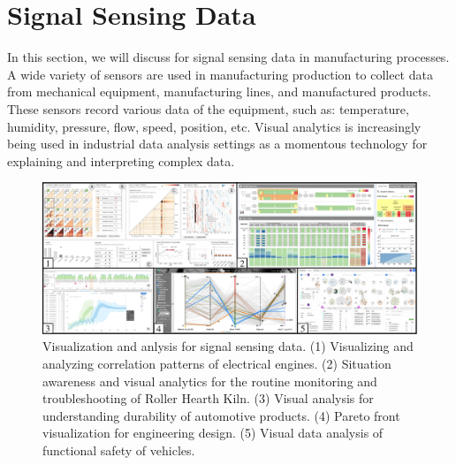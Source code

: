 \documentclass[a4paper,fleqn]{cas-dc}
\begin{document}
\section{Signal Sensing Data}
In this section, we will discuss for signal sensing data in manufacturing processes.
A wide variety of sensors are used in manufacturing production to collect data from mechanical equipment, manufacturing lines, and manufactured products.
These sensors record various data of the equipment, such as: temperature, humidity, pressure, flow, speed, position, etc.
Visual analytics is increasingly being used in industrial data analysis settings as a momentous technology for explaining and interpreting complex data.

\begin{figure}
	\centering
	\includegraphics[width=\textwidth]{Images/signal data.pdf}
	\vspace{-1em}
	\caption{Visualization and anlysis for signal sensing data. (1) Visualizing and analyzing correlation patterns of	electrical engines. (2) Situation awareness and visual analytics for the routine monitoring and troubleshooting of Roller Hearth Kiln. (3) Visual analysis for understanding durability of automotive products. (4) Pareto front visualization for engineering design. (5) Visual data analysis of functional safety of vehicles.}
	\label{fig:signaldata}
	\vspace{-1.5em}
\end{figure}

\end{document}
